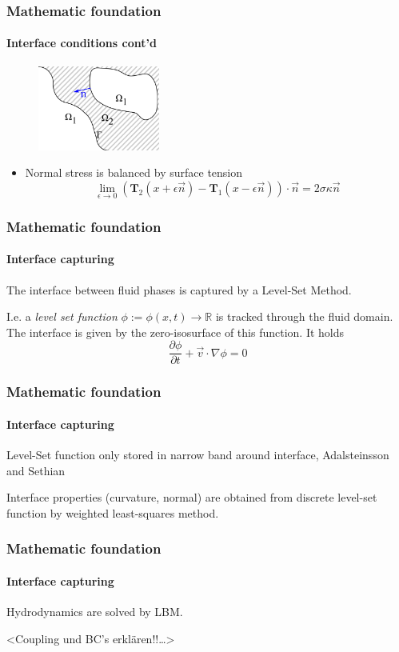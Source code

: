 \documentclass[ucs]{beamer}
\begin{document}
\begin{frame}
\frametitle{Mathematic foundation}
\framesubtitle{Interface conditions cont'd}
\begin{figure}[h!]
\includegraphics[width=4cm]{skizze.png}
\end{figure}
\begin{itemize}
\item<1->Normal stress is balanced by surface tension
  $$\lim_{\epsilon \to 0}(\textbf{T}_2(x+\epsilon \vec n) - \textbf{T}_1(x-\epsilon \vec n)) \cdot \vec n= 2\sigma \kappa \vec n$$
\end{itemize}
\vspace{-.5cm}
\end{frame}

\begin{frame}
\frametitle{Mathematic foundation}
\framesubtitle{Interface capturing}
The interface between fluid phases is captured by a Level-Set Method.

I.e. a \textit{level set function} $\phi:= \phi(x,t) \rightarrow \mathbb{R}$ is tracked through the fluid domain. The interface is given by the zero-isosurface of this function.
It holds
$$ \frac{\partial \phi}{\partial t} + \vec v \cdot \nabla \phi = 0$$
\end{frame}

\begin{frame}
\frametitle{Mathematic foundation}
\framesubtitle{Interface capturing}
Level-Set function only stored in narrow band around interface, Adalsteinsson and Sethian

Interface properties (curvature, normal) are obtained from discrete level-set function by weighted least-squares method.
\end{frame}

\begin{frame}
\frametitle{Mathematic foundation}
\framesubtitle{Interface capturing}
Hydrodynamics are solved by LBM.

<Coupling und BC's erklären!!\ldots>
\end{frame}
\end{document}
